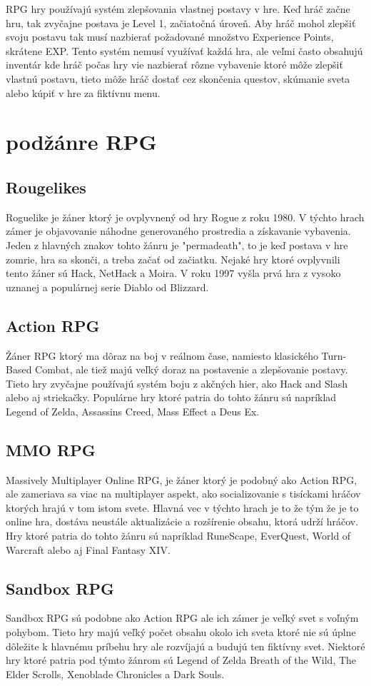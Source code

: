 \documentclass [10pt, twoside, slovak, a4paper] {article}
\begin{document}
RPG hry používajú systém zlepšovania vlastnej postavy v hre. Keď hráč začne hru, tak zvyčajne postava je Level 1, začiatočná úroveň. Aby hráč mohol zlepšiť svoju postavu tak musí nazbierať požadované množstvo Experience Points, skrátene EXP. Tento systém nemusí využívať každá hra, ale veľmi často obsahujú inventár kde hráč počas hry vie nazbierať rôzne vybavenie ktoré môže zlepšiť vlastnú postavu, tieto môže hráč dostať cez skončenia questov, skúmanie sveta alebo kúpiť v hre za fiktívnu menu.


\section {podžánre RPG}
\subsection {Rougelikes}
Roguelike je žáner ktorý je ovplyvnený od hry Rogue z roku 1980. V týchto hrach zámer je objavovanie náhodne generovaného prostredia a získavanie vybavenia. Jeden z hlavných znakov tohto žánru je "permadeath", to je keď postava v hre zomrie, hra sa skonči, a treba začať od začiatku. Nejaké hry ktoré ovplyvnili tento žáner sú Hack, NetHack a Moira. V roku 1997 vyšla prvá hra z vysoko uznanej a populárnej serie Diablo od Blizzard.
\subsection{Action RPG}
Žáner RPG ktorý ma dôraz na boj v reálnom čase, namiesto klasického Turn-Based Combat, ale tiež majú veľký doraz na postavenie a zlepšovanie postavy. Tieto hry zvyčajne používajú systém boju z akčných hier, ako Hack and Slash alebo aj striekačky. Populárne hry ktoré patria do tohto žánru sú napríklad Legend of Zelda, Assassins Creed, Mass Effect a Deus Ex.
\subsection{MMO RPG}
Massively Multiplayer Online RPG, je žáner ktorý je podobný ako Action RPG, ale zameriava sa viac na multiplayer aspekt, ako socializovanie s tisíckami hráčov ktorých hrajú v tom istom svete. Hlavná vec v týchto hrach je to že tým že je to online hra, dostáva neustále aktualizácie a rozšírenie obsahu, ktorá udrží hráčov. Hry ktoré patria do tohto žánru sú napríklad RuneScape, EverQuest, World of Warcraft alebo aj Final Fantasy XIV.
\subsection{Sandbox RPG}
Sandbox RPG sú podobne ako Action RPG ale ich zámer je veľký svet s voľným pohybom. Tieto hry majú veľký počet obsahu okolo ich sveta ktoré nie sú úplne dôležite k hlavnému príbehu hry ale rozvíjajú a budujú ten fiktívny svet. Niektoré hry ktoré patria pod týmto žánrom sú Legend of Zelda Breath of the Wild, The Elder Scrolls, Xenoblade Chronicles a Dark Souls.
\end{document}
